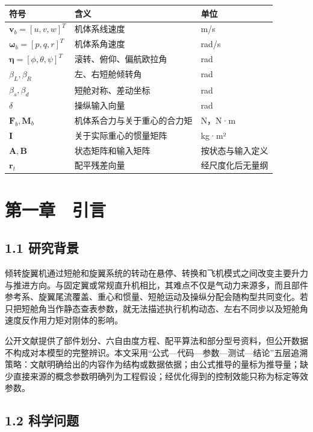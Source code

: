 \begin{longtable}[]{@{}lll@{}}
\toprule\noalign{}
符号 & 含义 & 单位 \\
\midrule\noalign{}
\endhead
\bottomrule\noalign{}
\endlastfoot
\(\mathbf{v}_b=[u,v,w]^T\) & 机体系线速度 & m/s \\
\(\boldsymbol{\omega}_b=[p,q,r]^T\) & 机体系角速度 & rad/s \\
\(\boldsymbol{\eta}=[\phi,\theta,\psi]^T\) & 滚转、俯仰、偏航欧拉角 &
rad \\
\(\beta_L,\beta_R\) & 左、右短舱倾转角 & rad \\
\(\beta_s,\beta_d\) & 短舱对称、差动坐标 & rad \\
\(\delta\) & 操纵输入向量 & rad \\
\(\mathbf{F}_b,\mathbf{M}_b\) & 机体系合力与关于重心的合力矩 & N，N·m \\
\(\mathbf{I}\) & 关于实际重心的惯量矩阵 & kg·m² \\
\(\mathbf{A},\mathbf{B}\) & 状态矩阵和输入矩阵 & 按状态与输入定义 \\
\(\mathbf{r}_t\) & 配平残差向量 & 经尺度化后无量纲 \\
\end{longtable}

\chapter{第一章　引言}\label{ux7b2cux4e00ux7ae0-ux5f15ux8a00}

\section{1.1 研究背景}\label{11-ux7814ux7a76ux80ccux666f}

倾转旋翼机通过短舱和旋翼系统的转动在悬停、转换和飞机模式之间改变主要升力与推进方向。与固定翼或常规直升机相比，其难点不仅是气动力来源多，而且部件参考系、旋翼尾流覆盖、重心和惯量、短舱运动及操纵分配会随构型共同变化。若只把短舱角当作静态查表参数，就无法描述执行机构动态、左右不同步以及短舱角速度反作用力矩对刚体的影响。

公开文献提供了部件划分、六自由度方程、配平算法和部分型号资料，但公开数据不构成对本模型的完整辨识。本文采用``公式---代码---参数---测试---结论''五层追溯策略：文献明确给出的内容作为结构或数据依据；由公式推导的量标为推导量；缺少直接来源的概念参数明确列为工程假设；经优化得到的控制效能只称为标定等效参数。

\section{1.2 科学问题}\label{12-ux79d1ux5b66ux95eeux9898}

